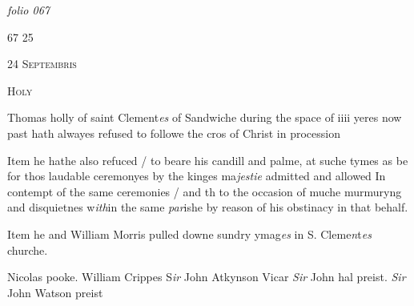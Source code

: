\documentclass[12pt, a4paper]{book}
\begin{document}
\textit{folio 067}


		
			\begin{flushright}
				{\color{Mahogany}67}
				25
			\end{flushright}
		
 
		
		               
				\begin{center} \begin{large} {\scshape 
		                  24 Septembris
		               } \end{large} \end{center}
			
		               
		                  
				\begin{center}  {\scshape Holy}  \end{center}
			
		               	
		               		
			
		               		
		\ifthenelse{\isodd{\thepage}}
		{\reversemarginpar}
		{\normalmarginpar}
		Thomas holly of saint Clement\textit{es} of Sandwiche
		  during the space of iiii yeres now past hath
		 alwayes refused to followe the cros of Christ in
		 procession
		               	
		
			
				\marginpar[\vspace{0.5cm}{\textcolor{Gray}{ceremonies}}]{}
			
			
		\ifthenelse{\isodd{\thepage}}
		{\reversemarginpar}
		{\normalmarginpar}
		Item he hathe also refuced / to beare his candill
		 and palme, at suche tymes as be for thos laudable
		 ceremonyes by the kinges ma\textit{jestie} admitted and allowed
		 In contempt of the same ceremonies / and th to the
		 occasion of muche murmuryng and disquietnes w\textit{ith}in
		 the same \textit{par}ishe by reason of his obstinacy in that
		 behalf.
		
		
			
			
		\ifthenelse{\isodd{\thepage}}
		{\reversemarginpar}
		{\normalmarginpar}
		Item he and William Morris pulled downe
		 sundry ymag\textit{es} in S. Cleme\textit{n}t\textit{es} churche.
		               	
		\ifthenelse{\isodd{\thepage}}
		{\reversemarginpar}
		{\normalmarginpar}
		Nicolas pooke. William Crippes S\textit{ir} John Atkynson Vicar \textit{Sir} John hal preist.
		               		\textit{Sir} John Watson preist
			
\end{document}
